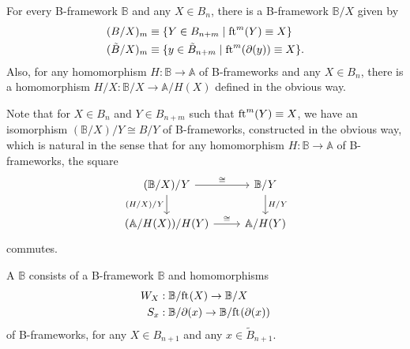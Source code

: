 \begin{defn}
For every B-framework $\mathbb{B}$ and any $X\in B_n$, there is a B-framework
$\mathbb{B}/X$ given by
\begin{align*}
(B/X)_{m} & \equiv \{Y\in B_{n+m}\mid\mathrm{ft}_{}^{m}(Y)\equiv X\}\\
(\tilde{B}/X)_m & \equiv \{y\in \tilde{B}_{n+m}\mid\mathrm{ft}_{}^m(\partial_{}(y))\equiv X\}.
\end{align*}
Also, for any homomorphism $H:\mathbb{B}\to\mathbb{A}$ of B-frameworks and any
$X\in B_n$, there is a homomorphism $H/X:\mathbb{B}/X\to\mathbb{A}/H(X)$
defined in the obvious way.
\end{defn}

\begin{rmk}
Note that for $X\in B_n$ and $Y\in B_{n+m}$ such that $\mathrm{ft}_{}^m(Y)\equiv X$, 
we have an isomorphism $(\mathbb{B}/X)/Y\cong B/Y$ of B-frameworks, constructed in the obvious way, which is natural in the sense that for any homomorphism $H:\mathbb{B}\to\mathbb{A}$ of B-frameworks, the square
\begin{equation*}
\begin{tikzcd}
(\mathbb{B}/X)/Y \arrow[r,"\cong"] \arrow[d,swap,"(H/X)/Y"] &  \mathbb{B}/Y \arrow[d,"H/Y"] \\
(\mathbb{A}/H(X))/H(Y) \arrow[r,"\cong"] & \mathbb{A}/H(Y)
\end{tikzcd}
\end{equation*}
commutes.
\end{rmk}

\begin{defn}
A  $\mathbb{B}$ consists of a B-framework $\mathbb{B}$ and homomorphisms
\begin{align*}
W_{X} & : \mathbb{B}/\mathrm{ft}_{}(X)\to\mathbb{B}/X\\
S_{x} & : \mathbb{B}/\partial_{}(x)\to\mathbb{B}/\mathrm{ft}_{}(\partial_{}(x))
\end{align*}
of B-frameworks, for any $X\in B_{n+1}$ and any $x\in\tilde{B}_{n+1}$. 
\end{defn}

\begin{comment}
\begin{lem}
When $\mathbb{B}$ has the structure of a B0-system, then so does each $\mathbb{B}/X$.
\end{lem}

\begin{proof}
Straightforward.
\end{proof}
\end{comment}

